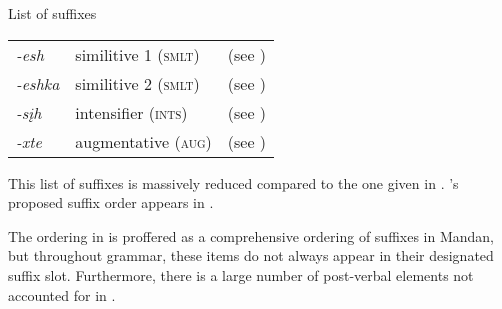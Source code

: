 \begin{exe}
\item\label{mandansuffixlist} List of suffixes

\begin{tabular}{lll}
\textit{-esh}	&	similitive 1 (\textsc{smlt})
	&	(see \sectref{suffixsimilitive1})\\
\textit{-eshka}	&	similitive 2 (\textsc{smlt})
	&	(see \sectref{suffixsimilitive2})\\
\textit{-sįh}	&	intensifier (\textsc{ints})
	&	(see \sectref{suffixintensifier})\\
\textit{-xte}	&	augmentative (\textsc{aug})
	& (see \sectref{augmentativesuffix})\\
\end{tabular} 

\end{exe}

This list of suffixes is massively reduced compared to the one given in \citet[15]{mixco1997a}. \citeauthor{mixco1997a}'s proposed suffix order appears in .

\begin{table}
\caption{Suffix field in Mandan per \citet{mixco1997a}} \label{suffixfieldmandan}

\end{table}

The ordering in  is proffered as a comprehensive ordering of suffixes in Mandan, but throughout  grammar, these items do not always appear in their designated suffix slot. Furthermore, there is a large number of post-verbal elements not accounted for in .

